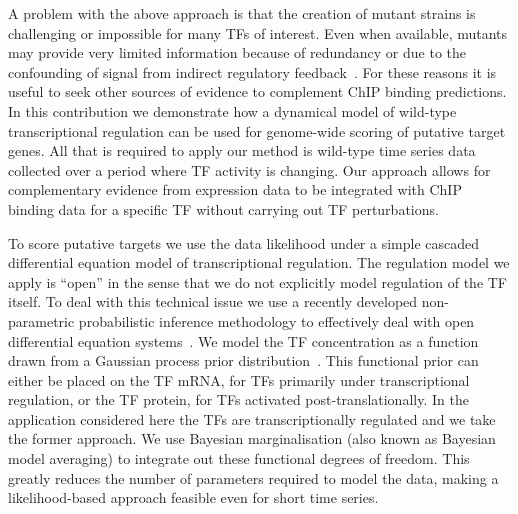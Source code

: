 \documentclass{pnastwo}
\begin{document}
\begin{article}
A problem with the above approach is that the creation of mutant
strains is challenging or impossible for many TFs of interest. Even
when available, mutants may provide very limited information because of redundancy or due to the
confounding of signal from indirect regulatory feedback~\cite{Gitter2009}. For these reasons it
is useful to seek other sources of evidence to complement ChIP binding
predictions. In this contribution we demonstrate how a dynamical model of wild-type transcriptional
regulation can be used for genome-wide scoring of putative target genes. All that is required to apply
our method is wild-type time series data collected over a period
where TF activity is changing. Our approach allows for complementary
evidence from expression data to be integrated with ChIP binding data
for a specific TF without carrying out TF perturbations. 

To score putative targets we use the data likelihood under a simple
cascaded differential equation model of transcriptional regulation. The regulation model
we apply is ``open'' in the sense that we do not explicitly model regulation of the TF
itself. To deal with this technical issue we use a recently developed
non-parametric probabilistic inference methodology to
effectively deal with open differential equation
systems~\cite{Gao2008}. We model the TF concentration as a function
drawn from a Gaussian process prior distribution~\cite{Rasmussen2006,Lawrence2010}.
This functional prior can either be placed
on the TF mRNA, for TFs primarily under transcriptional regulation,
or the TF protein, for TFs activated post-translationally. In the
application considered here the TFs are transcriptionally regulated
and we take the former approach. We use Bayesian marginalisation (also
known as Bayesian model averaging) to
integrate out these functional degrees of freedom. This greatly reduces the
number of parameters required to model the data, making a
likelihood-based approach feasible even for short time series.


\end{article}
\end{document}
